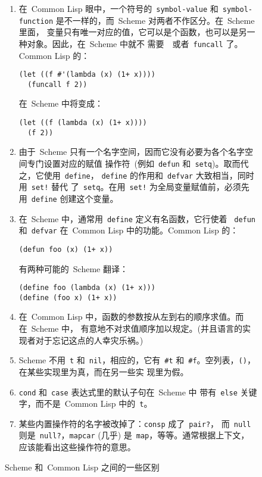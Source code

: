 \begin{figure}
  \begin{enumerate}
  \item 在~Common Lisp 眼中，一个符号的~\texttt{symbol-value}
    和~\texttt{symbol-function} 是不一样的，而~Scheme 对两者不作区分。在~Scheme 里面，
    变量只有唯一对应的值，它可以是个函数，也可以是另一种对象。因此，在~Scheme 中就不
    需要~\sq~或者~\texttt{funcall} 了。Common Lisp 的：
\begin{lstlisting}
(let ((f #'(lambda (x) (1+ x))))
  (funcall f 2))
\end{lstlisting}
    在~Scheme 中将变成：
\begin{lstlisting}
(let ((f (lambda (x) (1+ x))))
  (f 2))
\end{lstlisting}
  \item 由于~Scheme 只有一个名字空间，因而它没有必要为各个名字空间专门设置对应的赋值
    操作符~(例如~\texttt{defun} 和~\texttt{setq})。取而代之，它使用~\texttt{define}，
    \verb|define| 的作用和~\verb|defvar| 大致相当，同时用~\texttt{set!} 替代
    了~\texttt{setq}。在用~\texttt{set!} 为全局变量赋值前，必须先用~\texttt{define} 创建这个变量。
  \item 在~Scheme 中，通常用~\texttt{define} 定义有名函数，它行使着
    ~\texttt{defun} 和~\texttt{defvar} 在~Common Lisp 中的功能。Common Lisp 的：
\begin{lstlisting}
(defun foo (x) (1+ x))
\end{lstlisting}
    有两种可能的~Scheme 翻译：
\begin{lstlisting}
(define foo (lambda (x) (1+ x)))
(define (foo x) (1+ x))
\end{lstlisting}
  \item 在~Common Lisp 中，函数的参数按从左到右的顺序求值。而在~Scheme 中，
    有意地不对求值顺序加以规定。(并且语言的实现者对于忘记这点的人幸灾乐祸。)
  \item Scheme 不用~\verb|t| 和~\verb|nil|，相应的，它有~\verb|#t|
    和~\verb|#f|。空列表，\verb|()|，在某些实现里为真，而在另一些实
    现里为假。
  \item \texttt{cond} 和~\texttt{case} 表达式里的默认子句在~Scheme 中
    带有~\texttt{else} 关键字，而不是~Common Lisp 中的~\texttt{t}。
  \item 某些内置操作符的名字被改掉了：\texttt{consp} 成了~\texttt{pair?}，
    而~\texttt{null} 则是~\texttt{null?}，\texttt{mapcar} (几乎)
    是~\texttt{map}，等等。通常根据上下文，应该能看出这些操作符的意思。
  \end{enumerate}
  \caption{Scheme 和~Common Lisp 之间的一些区别}
  \label{fig:some_differences_between_scheme_and_common_lisp}
\end{figure}

